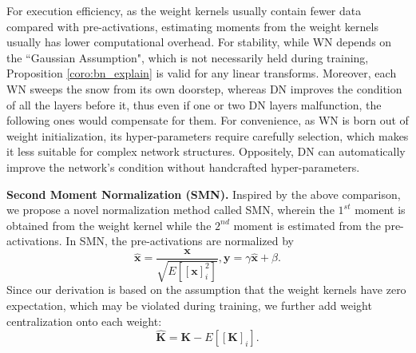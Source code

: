 \documentclass[10pt,journal,compsoc]{IEEEtran}
\begin{document}
For execution efficiency, as the weight kernels usually contain fewer data compared with pre-activations, estimating moments from the weight kernels usually has lower computational overhead. For stability, while WN depends on the ``Gaussian Assumption", which is not necessarily held during training, Proposition \ref{coro:bn_explain} is valid for any linear transforms. Moreover, each WN sweeps the snow from its own doorstep, whereas DN improves the condition of all the layers before it, thus even if one or two DN layers malfunction, the following ones would compensate for them. For convenience, as WN is born out of weight initialization, its hyper-parameters require carefully selection, which makes it less suitable for complex network structures. Oppositely, DN can automatically improve the network's condition without handcrafted hyper-parameters. 


\textbf{Second Moment Normalization (SMN).} Inspired by the above comparison, we propose a novel normalization method called SMN, wherein the $1^{st}$ moment is obtained from the weight kernel while the $2^{nd}$ moment is estimated from the pre-activations. In SMN, the pre-activations are normalized by
\begin{equation}
    \hat{\mathbf{x}} = \frac{\mathbf{x}}{\sqrt{E\left[[\mathbf{x}]_i^2\right]}}, \mathbf{y}=\gamma\hat{\mathbf{x}} + \beta.
\end{equation}
Since our derivation is based on the assumption that the weight kernels have zero expectation, which may be violated during training, we further add weight centralization onto each weight:
\begin{equation}
    \hat{\mathbf{K}} = \mathbf{K} - E[[\mathbf{K}]_i].
\end{equation}
\end{document}
